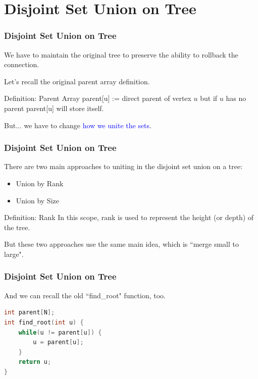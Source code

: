 \section{Disjoint Set Union on Tree}

\begin{frame}
\frametitle{Disjoint Set Union on Tree}
We have to maintain the original tree to preserve the ability to rollback the connection.

\medskip

Let's recall the original parent array definition.

\begin{block}{Definition: Parent Array}
    parent[u] := direct parent of vertex $u$ but if $u$ has no parent parent[u] will store itself.
\end{block}

But... we have to change \textcolor{blue}{how we unite the sets}.

\end{frame}

\begin{frame}
\frametitle{Disjoint Set Union on Tree}
There are two main approaches to uniting in the disjoint set union on a tree:

\begin{itemize}
    \item Union by Rank
    \item Union by Size
\end{itemize}

\begin{block}{Definition: Rank}
     In this scope, rank is used to represent the height (or depth) of the tree.
\end{block}

But these two approaches use the same main idea, which is ``merge small to large".

\end{frame}

\begin{frame}[fragile]
\frametitle{Disjoint Set Union on Tree}
And we can recall the old ``find\_root" function, too.

\begin{lstlisting}[language=C++, basicstyle=\small]
int parent[N];
int find_root(int u) {
    while(u != parent[u]) {
        u = parent[u];
    }
    return u;
}
\end{lstlisting}

\end{frame}


